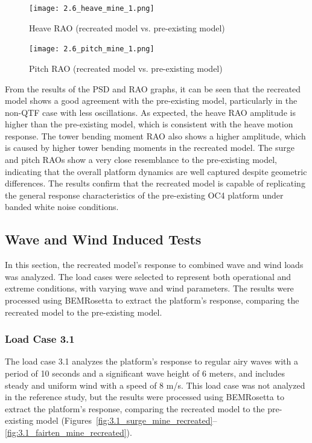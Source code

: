 \documentclass[a4paper, 11pt]{article}
\begin{document}
\begin{figure}[H]
    \begin{minipage}{0.48\textwidth}
        \centering
        \texttt{[image: 2.6\_heave\_mine\_1.png]}
        \caption{\small Heave RAO (recreated model vs. pre-existing model)}
        \label{fig:2.6_heave_mine_recreated}
    \end{minipage}
    \hfill
    \begin{minipage}{0.48\textwidth}
        \centering
        \texttt{[image: 2.6\_pitch\_mine\_1.png]}
        \caption{\small Pitch RAO (recreated model vs. pre-existing model)}
        \label{fig:2.6_pitch_mine_recreated}
    \end{minipage}
\end{figure}

From the results of the PSD and RAO graphs, it can be seen that the recreated model shows a good agreement with the pre-existing model, particularly in the non-QTF case with less oscillations. As expected, the heave RAO amplitude is higher than the pre-existing model, which is consistent with the heave motion response. The tower bending moment RAO also shows a higher amplitude, which is caused by higher tower bending moments in the recreated model. The surge and pitch RAOs show a very close resemblance to the pre-existing model, indicating that the overall platform dynamics are well captured despite geometric differences. The results confirm that the recreated model is capable of replicating the general response characteristics of the pre-existing OC4 platform under banded white noise conditions.

\subsection{Wave and Wind Induced Tests}
\hspace*{0.5cm}In this section, the recreated model's response to combined wave and wind loads was analyzed. The load cases were selected to represent both operational and extreme conditions, with varying wave and wind parameters. The results were processed using BEMRosetta to extract the platform's response, comparing the recreated model to the pre-existing model.

\subsubsection{Load Case 3.1}
\hspace*{0.5cm}The load case 3.1 analyzes the platform's response to regular airy waves with a period of 10 seconds and a significant wave height of 6 meters, and includes steady and uniform wind with a speed of 8 m/s. This load case was not analyzed in the reference study, but the results were processed using BEMRosetta to extract the platform's response, comparing the recreated model to the pre-existing model (Figures~\ref{fig:3.1_surge_mine_recreated}--\ref{fig:3.1_fairten_mine_recreated}).
\end{document}
